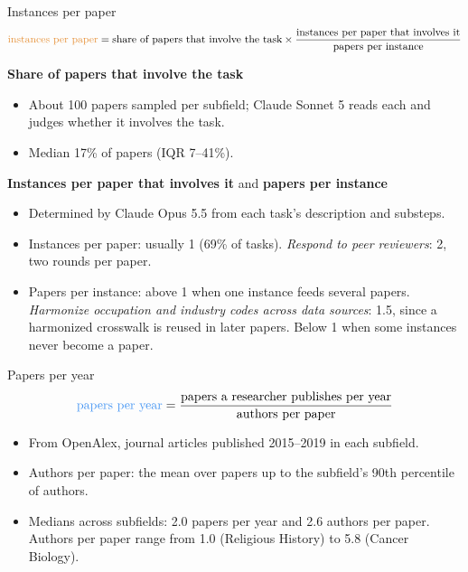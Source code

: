 \documentclass[aspectratio=169,11pt]{beamer}
\newcommand{\IN}[1]{{\color{laorange}#1}}       %
\newcommand{\PY}[1]{{\color{lalightblue}#1}}    %
\newcommand{\tx}[1]{\text{#1}}
\newcommand{\divider}{\par\vspace{0.3em}{\color{lablue!30}\rule{\linewidth}{1pt}}\par\vspace{0.2em}}
\newcommand{\desc}[1]{{\color{lablue!70}#1}}
\begin{document}
\begin{frame}{\IN{Instances per paper}}
\begingroup\small
\[
\IN{\tx{instances per paper}} = \tx{share of papers that involve the task} \times
  \frac{\tx{instances per paper that involves it}}{\tx{papers per instance}}
\]
\endgroup
\vspace{-0.8em}
\divider
\small
\textbf{Share of papers that involve the task}
\begin{itemize}
  \item About 100 papers sampled per subfield; Claude Sonnet 5 reads each and judges whether it involves the task.
  \item \desc{Median 17\% of papers (IQR 7--41\%).}
\end{itemize}
\vspace{0.1em}
\textbf{Instances per paper that involves it} and \textbf{papers per instance}
\begin{itemize}
  \item Determined by Claude Opus 5.5 from each task's description and substeps.
  \item \desc{Instances per paper: usually 1 (69\% of tasks). \emph{Respond to peer reviewers}: 2, two rounds per
  paper.}
  \item \desc{Papers per instance: above 1 when one instance feeds several papers. \emph{Harmonize occupation and
  industry codes across data sources}: 1.5, since a harmonized crosswalk is reused in later papers. Below 1 when some
  instances never become a paper.}
\end{itemize}
\end{frame}

\begin{frame}{\PY{Papers per year}}
\begingroup\small
\[
\PY{\tx{papers per year}} = \frac{\tx{papers a researcher publishes per year}}{\tx{authors per paper}}
\]
\endgroup
\vspace{-0.8em}
\divider
\small
\begin{itemize}\setlength\itemsep{0.6em}
  \item From OpenAlex, journal articles published 2015--2019 in each subfield.
  \item Authors per paper: the mean over papers up to the subfield's 90th percentile of authors.
  \item \desc{Medians across subfields: 2.0 papers per year and 2.6 authors per paper. Authors per paper range from 1.0
  (Religious History) to 5.8 (Cancer Biology).}
\end{itemize}
\end{frame}
\end{document}
